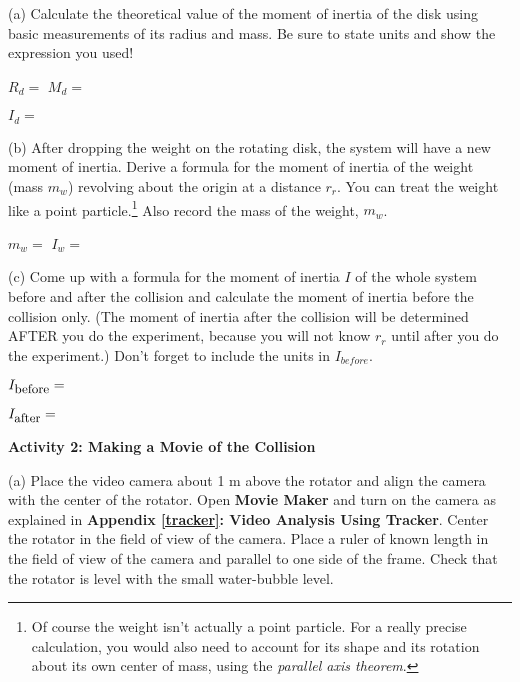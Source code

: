 (a) Calculate the theoretical value of the moment of inertia of the disk
using basic measurements of its radius and mass. Be sure to state units and
show the expression you used!
\vspace{5mm}

\( R_{d} =\)  \hfill{}\( M_{d}= \) \hfill{}
\vspace{5mm}

\( I_{d}= \)
\vspace{5mm}

(b) After dropping the weight on the rotating disk, the system will have a new
moment of inertia. Derive a formula for the moment of inertia of the weight (mass $m_w$) revolving about the origin at a distance $r_r$. You can treat the weight like a point particle.\footnote{Of course the weight isn't actually a point particle.  For a really precise calculation, you would also need to account for its shape and its rotation about its own center of mass, using the \textit{parallel axis theorem}.}  Also record the mass of the weight, $m_w$.
\vspace{5mm}

$m_w=$ \hfill{} $I_w =$ \hfill{}  
\vspace{10mm}



\pagebreak[2]
(c) Come up with a formula for the moment of inertia $I$ of the whole system
before and after the collision and calculate the moment of inertia before the
collision only. (The moment of inertia after the collision will be determined AFTER you do the experiment, because you will not know \( r_{r} \) until after you do the experiment.) Don't forget to include the units in \( I_{before} \).
\vspace{5mm}

\( I_{\mbox{\small before}}= \) 
\vspace{5mm}

\( I_{\mbox{\small after}} =\)  
\vspace{5mm}

\textbf{Activity 2: Making a Movie of the Collision} 

(a) Place the video camera about 1 m above the rotator and align the camera with
the center of the rotator. Open \textbf{Movie Maker} and turn on the camera as explained 
in \textbf{Appendix \ref{tracker}: Video Analysis Using Tracker}.  Center the rotator in the
field of view of the camera. Place a ruler of known length in the field of view of the camera and parallel to one side of the frame. Check that the rotator is level with the small water-bubble level.

